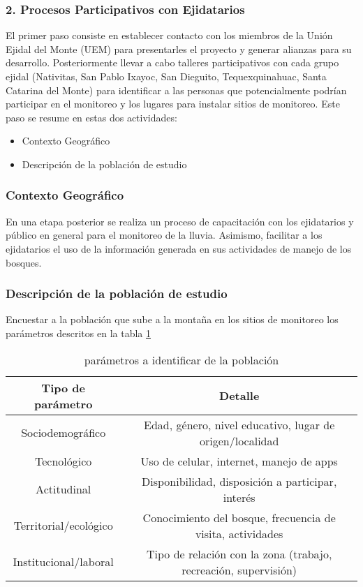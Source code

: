 \subsubsection{2. Procesos Participativos con Ejidatarios} 
El primer paso consiste en establecer contacto con los miembros de la Unión Ejidal del Monte (UEM) para presentarles el proyecto y generar alianzas para su desarrollo. Posteriormente llevar a cabo talleres participativos con cada grupo ejidal (Nativitas, San Pablo Ixayoc, San Dieguito, Tequexquinahuac, Santa Catarina del Monte) para identificar a las personas que potencialmente podrían participar en el monitoreo y los lugares para instalar sitios de monitoreo. Este paso se resume en estas dos actividades:
\begin{itemize}
  \item Contexto Geográfico
  \item Descripción de la población de estudio
\end{itemize}


\subsubsection*{Contexto Geográfico}



En una etapa posterior se realiza un proceso de capacitación con los ejidatarios y público en general para el monitoreo de la lluvia. Asimismo, facilitar a los ejidatarios el uso de la información generada en sus actividades de manejo de los bosques.

\subsubsection*{Descripción de la población de estudio}

Encuestar a la población que sube a la montaña en los sitios de monitoreo los parámetros descritos en la tabla \ref{tabt3}
\begin{table}[h!]
\centering
\begin{tabular}{@{}cc@{}}
\toprule
Tipo de parámetro & Detalle                                           \\ \midrule
Sociodemográfico      & Edad, género, nivel educativo, lugar de origen/localidad          \\
Tecnológico       & Uso de celular, internet, manejo de apps          \\
Actitudinal       & Disponibilidad, disposición a participar, interés \\
Territorial/ecológico & Conocimiento del bosque, frecuencia de visita, actividades      \\
Institucional/laboral & Tipo de relación con la zona (trabajo, recreación, supervisión) \\ \bottomrule
\end{tabular}
\caption{parámetros a identificar de la población}
\label{tabt3}
\end{table}
\newpage



